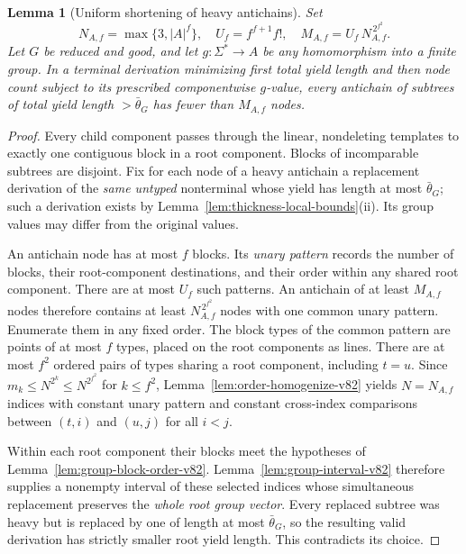 \documentclass[11pt]{article}
\numberwithin{equation}{section}
\theoremstyle{plain}
\newtheorem{lemma}[theorem]{Lemma}
\theoremstyle{definition}
\theoremstyle{remark}
\theoremstyle{plain}
\begin{document}
\begin{lemma}[Uniform shortening of heavy antichains]
\label{lem:group-heavy-antichain}
Set
\[
 N_{A,f}=\max\{3,|A|^f\},\quad
 U_f=f^{f+1}f!,\quad
 M_{A,f}=U_f\,N_{A,f}^{\,2^{f^2}}.
\]
Let $G$ be reduced and good, and let $g:\Sigma^*\to A$
be any homomorphism into a finite group.  In a terminal
derivation minimizing first total yield length and then
node count subject to its prescribed componentwise
$g$-value, every antichain of subtrees of total yield
length $>\bar\theta_G$ has fewer than $M_{A,f}$ nodes.
\end{lemma}
\begin{proof}
Every child component passes through the linear,
nondeleting templates to exactly one contiguous block
in a root component.  Blocks of incomparable subtrees
are disjoint.  Fix for each node of a heavy antichain
a replacement derivation of the \emph{same untyped}
nonterminal whose yield has length at most
$\bar\theta_G$; such a derivation exists by
Lemma~\ref{lem:thickness-local-bounds}(ii).
Its group values may differ from the original values.

An antichain node has at most $f$ blocks.  Its
\emph{unary pattern} records the number of blocks,
their root-component destinations, and their order
within any shared root component.  There are at
most $U_f$ such patterns.  An antichain of at least
$M_{A,f}$ nodes therefore contains at least
$N_{A,f}^{\,2^{f^2}}$ nodes with one common unary
pattern.  Enumerate them in any fixed order.  The block
types of the common pattern are points of at most $f$
types, placed on the root components as lines.  There
are at most $f^2$ ordered pairs of types sharing a root
component, including $t=u$.  Since
$m_k\le N^{2^k}\le N^{2^{f^2}}$ for $k\le f^2$,
Lemma~\ref{lem:order-homogenize-v82} yields $N=N_{A,f}$
indices with constant unary pattern and constant
cross-index comparisons between $(t,i)$ and $(u,j)$
for all $i<j$.

Within each root component their blocks meet
the hypotheses of
Lemma~\ref{lem:group-block-order-v82}.
Lemma~\ref{lem:group-interval-v82} therefore supplies
a nonempty interval of these selected indices
whose simultaneous replacement preserves the
\emph{whole root group vector}.  Every replaced
subtree was heavy but is replaced by one of length
at most $\bar\theta_G$, so the resulting valid
derivation has strictly smaller root yield length.
This contradicts its choice.
\end{proof}
\end{document}
